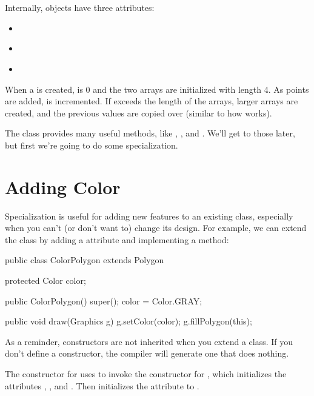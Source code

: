 Internally,  objects have three attributes:

\begin{itemize}

\item {} {\tt ~~~} 

\item {} {\tt ~} 

\item {} {\tt ~} 

\end{itemize}

When a  is created,  is 0 and the two arrays are initialized with length 4.
As points are added,  is incremented.
If  exceeds the length of the arrays, larger arrays are created, and the previous values are copied over (similar to how  works).

The  class provides many useful methods, like , , and .
We'll get to those later, but first we're going to do some specialization.


\section{Adding Color}

Specialization is useful for adding new features to an existing class, especially when you can't (or don't want to) change its design.
For example, we can extend the  class by adding a  attribute and implementing a  method:

\begin{code}
public class ColorPolygon extends Polygon {
    protected Color color;

    public ColorPolygon() {
        super();
        color = Color.GRAY;
    }
    
    public void draw(Graphics g) {
        g.setColor(color);
        g.fillPolygon(this);
    }
}
\end{code}

As a reminder, constructors are not inherited when you extend a class.
If you don't define a constructor, the compiler will generate one that does nothing.

The constructor for  uses  to invoke the constructor for , which initializes the attributes , , and .
Then  initializes the  attribute to .

